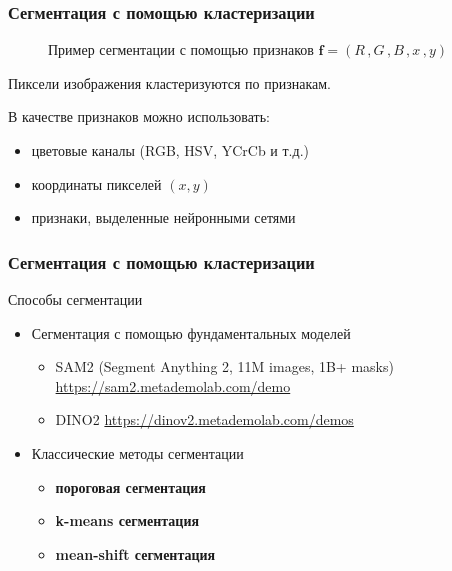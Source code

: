 \documentclass[12pt, usepdftitle=false, aspectratio=1610]{beamer}
\begin{document}
\begin{frame}
\frametitle{Сегментация с помощью кластеризации}
\begin{figure}
    \captionsetup[subfigure]{labelformat=empty}
    \centering
    \qquad
    \caption*{Пример сегментации с помощью признаков $\boldsymbol{f}=\left(R\,,G\,,B\,,x\,,y\right)$}
\end{figure}

Пиксели изображения кластеризуются по признакам.
\vspace{0.2cm}

В качестве признаков можно использовать:
\begin{itemize}
    \item цветовые каналы (RGB, HSV, YCrCb и т.д.)
    \vspace{0.2cm}
    \item координаты пикселей $(x, y)$
    \vspace{0.2cm}
    \item признаки, выделенные нейронными сетями
\end{itemize}
\end{frame}

\begin{frame}
\frametitle{Сегментация с помощью кластеризации}

Способы сегментации
\vspace{0.4cm}

\begin{itemize}
    \item Сегментация с помощью фундаментальных моделей
    \begin{itemize}
        \item SAM2  (Segment Anything 2, 11M images, 1B+ masks) \url{https://sam2.metademolab.com/demo}
        \vspace{0.2cm}
        \item DINO2 \url{https://dinov2.metademolab.com/demos}
    \end{itemize}
    \vspace{0.2cm}

    \item Классические методы сегментации
    \begin{itemize}
        \item \textbf{пороговая сегментация}
        \vspace{0.2cm}
        \item \textbf{k-means сегментация}
        \vspace{0.2cm}
        \item \textbf{mean-shift сегментация}
    \end{itemize}
\end{itemize}
\end{frame}
\end{document}
